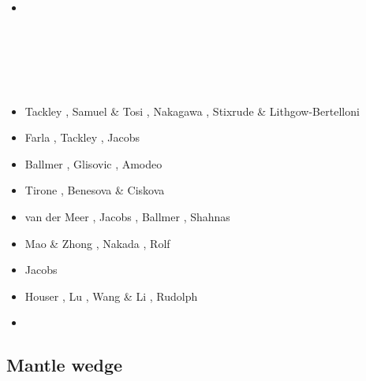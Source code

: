 \begin{scriptsize}
\begin{itemize}
\item[\twothousandeleven] 
\textcite{mayw11} \\
\textcite{java11} \\
\textcite{faff11} \\
\textcite{nata11} \\
\textcite{vayj11} \\
\textcite{stli11} \\
\item[\twothousandtwelve] 
Tackley \cite{tack12}, Samuel \& Tosi \cite{sato12}, 
                    Nakagawa \etal \cite{natd12}, Stixrude \& Lithgow-Bertelloni \cite{stli12}
\item[\twothousandthirteen] Farla \etal \cite{fakc13}, Tackley \etal \cite{taab13}, Jacobs \etal \cite{jasv13}
\item[\twothousandfifteen] Ballmer \etal \cite{basn15}, Glisovic \etal \cite{glfa15}, Amodeo \etal \cite{amsb15}
\item[\twothousandsixteen] Tirone \cite{tiro16}, Benesova \& Ciskova \cite{beci16}
\item[\twothousandseventeen] van der Meer \etal \cite{vavs17}, Jacobs \etal \cite{jasv17}, 
                             Ballmer \etal \cite{bahh17}, Shahnas \etal \cite{shyp17,shpj17}
\item[\twothousandeighteen] Mao \& Zhong \cite{mazh18}, Nakada \etal \cite{naoi18}, Rolf \etal \cite{roct18}
\item[\twothousandnineteen] Jacobs \etal \cite{jasv19}
\item[\twothousandtwenty] Houser \etal \cite{hohv20}, Lu \etal{} \cite{lufs20}, Wang \& Li \cite{wali20},
                          Rudolph \etal \cite{ruml20}
\item[\twothousandtwentyone] 
\cite{pocv21} 
\cite{vepn21}
\cite{adkc21} 
\cite{gath21}
\cite{ligl21b}
\cite{gubt21}
\end{itemize}
\end{scriptsize}


\subsection{Mantle wedge} 

